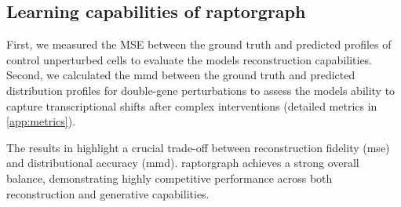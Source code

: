 \subsection{Learning capabilities of \gls{raptorgraph}} First, we measured the MSE between the ground truth and predicted profiles of control unperturbed cells to evaluate the models reconstruction capabilities.
Second, we calculated the \gls{mmd} between the ground truth and predicted distribution profiles for double-gene perturbations to assess the models ability to capture transcriptional shifts after complex interventions (detailed metrics in \cref{app:metrics}). 
%
\begin{table}[htb]
\vspace{-10pt}
    \centering
    \caption{Results using the Norman-CPA dataset are averaged over $3$ runs. Bold: best results; Italics: second best.  
    *We excluded the GEARS model because it behaves in a fundamentally different way that is incompatible with our evaluation framework, making a fair and direct comparison impossible (see \cref{app:metrics:gears_exclusion}).}
    \label{tab:MMD_results}
    \vskip 0.15in
    \begin{center}
    \begin{small}
    \end{small}
    \end{center}
    \vskip -0.1in
\end{table}
%

The results in  highlight a crucial trade-off between reconstruction fidelity (\gls{mse}) and distributional accuracy (\gls{mmd}).
\Gls{raptorgraph} achieves a strong overall balance, demonstrating highly competitive performance across both reconstruction and generative capabilities. 


